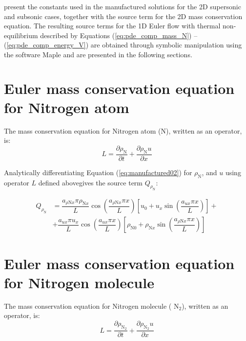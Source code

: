 \documentclass[10pt]{article}
\newcommand{\diff}[2] {\dfrac{\partial #1 }{\partial #2}}
\begin{document}
\citet{Roy2002} present the constants used in the manufactured solutions for the 2D supersonic and subsonic cases, together with the source term for the 2D mass conservation equation. The resulting source terms for the 1D Euler flow with thermal non-equilibrium described by Equations (\ref{eq:pde_comp_mass_N}) -- (\ref{eq:pde_comp_energy_V}) are obtained through symbolic manipulation using the software Maple and are presented in the following sections.


\section{Euler mass conservation equation for Nitrogen atom}

The mass conservation equation for Nitrogen atom (N), written as an operator, is:
\begin{equation}
 \label{eq:euler1d_11}
L= \diff{\rho_\text{N}}{t} + \diff{\rho_\text{N} u}{x} 
\end{equation}

Analytically differentiating Equation (\ref{eq:manufactured02}) for $\rho_{\text{N}}$,  and $u$ using operator $L$ defined abovegives the source term $Q_{\rho_{\text{N}}}$:

\begin{equation}
\begin{split}
Q_{\rho_\text{N}} &=\dfrac{a_{\rho \text{N} x} \pi \rho_{\text{N}x}  }{L}\cos\left(\dfrac{a_{\rho \text{N} x} \pi x}{L}\right) \left[u_0+u_x \sin\left(\dfrac{a_{ux} \pi x}{L}\right)\right] +\\
& + \dfrac{a_{ux} \pi u_x }{L}\cos\left(\dfrac{a_{ux} \pi x}{L}\right) \left[\rho_{\text{N}0}+\rho_{\text{N}x} \sin\left(\dfrac{a_{\rho \text{N} x} \pi x}{L}\right)\right]
\end{split}
\end{equation}


\section{Euler mass conservation equation for Nitrogen molecule}

The mass conservation equation for Nitrogen molecule ( $\text{N}_2$), written as an operator, is:
\begin{equation}
 \label{eq:euler1d_11a}
L= \diff{\rho_{\text{N}_2}}{t} + \diff{\rho_{\text{N}_2} u }{x} 
\end{equation}
\end{document}
